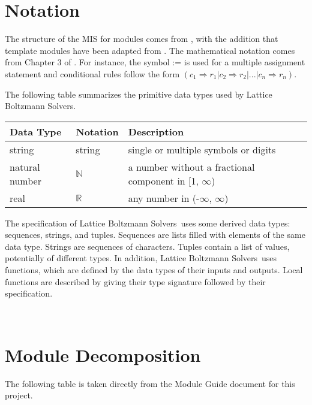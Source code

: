 \documentclass[12pt, titlepage]{article}
\newcommand{\famname}{Lattice Boltzmann Solvers}
\begin{document}
\section{Notation}

The structure of the MIS for modules comes from \citet{HoffmanAndStrooper1995},
with the addition that template modules have been adapted from
\cite{GhezziEtAl2003}.  The mathematical notation comes from Chapter 3 of
\citet{HoffmanAndStrooper1995}.  For instance, the symbol := is used for a
multiple assignment statement and conditional rules follow the form $(c_1
\Rightarrow r_1 | c_2 \Rightarrow r_2 | ... | c_n \Rightarrow r_n )$.

The following table summarizes the primitive data types used by \famname. 

\begin{center}
\renewcommand{\arraystretch}{1.2}
\noindent 
\begin{tabular}{l l p{7.5cm}} 
\toprule 
\textbf{Data Type} & \textbf{Notation} & \textbf{Description}\\ 
\midrule
string & string & single or multiple symbols or digits\\
natural number & $\mathbb{N}$ & a number without a fractional component in [1, $\infty$) \\
real & $\mathbb{R}$ & any number in (-$\infty$, $\infty$)\\
\bottomrule
\end{tabular} 
\end{center}

\noindent
The specification of \famname \ uses some derived data types: sequences, strings, and
tuples. Sequences are lists filled with elements of the same data type. Strings
are sequences of characters. Tuples contain a list of values, potentially of
different types. In addition, \famname \ uses functions, which
are defined by the data types of their inputs and outputs. Local functions are
described by giving their type signature followed by their specification.

~\newpage

\section{Module Decomposition}

The following table is taken directly from the Module Guide document for this project.
\end{document}
